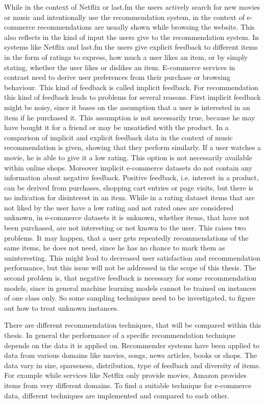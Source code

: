 \documentclass[10pt]{reportMaster}
\begin{document}
While in the context of Netflix or last.fm the users actively search for new movies or music and intentionally use the recommendation system, in the context of e-commerce recommendations are usually shown while browsing the website.
This also reflects in the kind of input the users give to the recommendation system.
In systems like Netflix  \cite{netflixPrize} and last.fm \cite{implExplComparisonLastfm} the users give explicit feedback to different items in the form of ratings to express, how much a user likes an item, or by simply stating, whether the user likes or dislikes an item.
E-commerce services in contrast need to derive user preferences from their purchase or browsing behaviour.
This kind of feedback is called implicit feedback.
For recommendation this kind of feedback leads to problems for several reasons.
First implicit feedback might be noisy, since it bases on the assumption that a user is interested in an item if he purchased it.
This assumption is not necessarily true, because he may have bought it for a friend or may be unsatisfied with the product.
In \cite{implExplComparisonLastfm} a comparison of implicit and explicit feedback data in the context of music recommendation is given, showing that they perform similarly.
If a user watches a movie, he is able to give it a low rating.
This option is not necessarily available within online shops.
Moreover implicit e-commerce datasets do not contain any information about negative feedback.
Positive feedback, i.e. interest in a product, can be derived from purchases, shopping cart entries or page visits, but there is no indication for disinterest in an item.
While in a rating dataset items that are not liked by the user have a low rating and not rated ones are considered unknown, in e-commerce datasets it is unknown, whether items, that have not been purchased, are not interesting or not known to the user.
This raises two problems.
It may happen, that a user gets repeatedly recommendations of the same items, he does not need, since he has no chance to mark them as uninteresting.
This might lead to decreased user satisfaction and recommendation performance, but this issue will not be addressed in the scope of this thesis.
The second problem is, that negative feedback is necessary for some recommendation models, since in general machine learning models cannot be trained on instances of one class only.
So some sampling techniques need to be investigated, to figure out how to treat unknown instances.

There are different recommendation techniques, that will be compared within this thesis.
In general the performance of a specific recommendation technique depends on the data it is applied on.
Recommender systems have been applied to data from various domains like movies, songs, news articles, books or shops.
The data vary in size, sparseness, distribution, type of feedback and diversity of items.
For example while services like Netflix only provide movies, Amazon provides items from very different domains.
To find a suitable technique for e-commerce data, different techniques are implemented and compared to each other.
\end{document}
